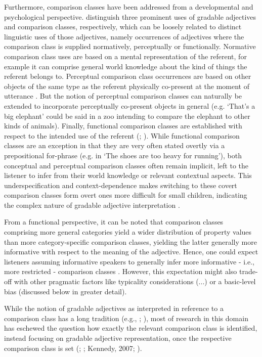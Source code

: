 Furthermore, comparison classes have been addressed from a developmental and psychological perspective. \cite{ebeling1994children} distinguish three prominent uses of gradable adjectives and comparison classes, respectively, which can be loosely related to distinct linguistic uses of those adjectives, namely occurrences of adjectives where the comparison class is supplied normatively, perceptually or functionally. 
Normative comparison class uses are based on a mental representation of the referent, for example it can comprise general world knowledge about the kind of things the referent belongs to. 
Perceptual comparison class occurrences are based on other objects of the same type as the referent physically co-present at the moment of utterance \parencite{ebeling1994children}. But the notion of perceptual comparison classes can naturally be extended to incorporate perceptually co-present objects in general (e.g. ‘That’s a big elephant’ could be said in a zoo intending to compare the elephant to other kinds of animals).
Finally, functional comparison classes are established with respect to the intended use of the referent (\cite{ebeling1994children}; \cite{sera1987}). 
While functional comparison classes are an exception in that they are very often stated overtly via a prepositional for-phrase (e.g. in ‘The shoes are too heavy for running’), both conceptual and perceptual comparison classes often remain implicit, left to the listener to infer from their world knowledge or relevant contextual aspects. This underspecification and context-dependence makes switching to these covert comparison classes form overt ones more difficult for small children, indicating the complex nature of gradable adjective interpretation \parencite{ebeling1994children}.

From a functional perspective, it can be noted that comparison classes comprising more general categories yield a wider distribution of property values than more category-specific comparison classes, yielding the latter generally more informative with respect to the meaning of the adjective. Hence, one could expect listeners assuming informative speakers to generally infer more informative - i.e., more restricted - comparison classes \parencite{tessler2017warm}.  However, this expectation might also trade-off with other pragmatic factors like typicality considerations (...) or a basic-level bias (discussed below in greater detail). 

While the notion of gradable adjectives as interpreted in reference to a comparison class has a long tradition (e.g., \cite{bartsch1973}; \cite{Bierwisch1989}), most of research in this domain has eschewed the question how exactly the relevant comparison class is identified, instead focusing on gradable adjective representation, once the respective comparison class is set (\cite{Kennedy2007}; \cite{Solt2009}; Kennedy, 2007; \cite{Kamp1975}).

